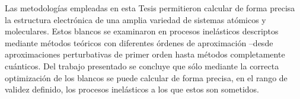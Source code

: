 %
Las metodologías empleadas en esta Tesis permitieron calcular de forma 
precisa la estructura electrónica de una amplia variedad de sistemas 
atómicos y moleculares. Estos blancos se examinaron en procesos 
inelásticos descriptos mediante métodos teóricos con diferentes órdenes 
de aproximación --desde aproximaciones perturbativas de primer orden 
hasta métodos completamente cuánticos. Del trabajo presentado se 
concluye que sólo mediante la correcta optimización de los blancos se 
puede calcular de forma precisa, en el rango de validez definido, los 
procesos inelásticos a los que estos son sometidos.


